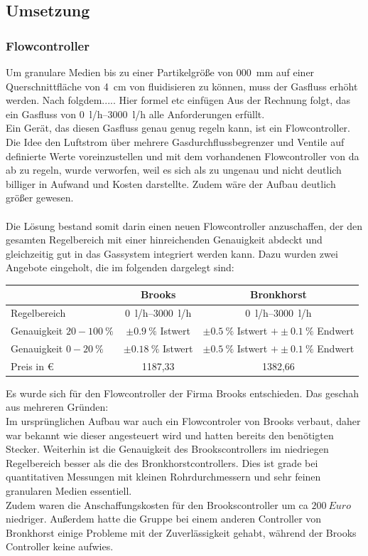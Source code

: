\subsection{Umsetzung}

\subsubsection{Flowcontroller}

Um granulare Medien bis zu einer Partikelgröße von \SI{000}{mm} auf einer Querschnittfläche von \SI{4}{cm} von fluidisieren zu können, muss der Gasfluss erhöht werden. Nach folgdem..... Hier formel etc einfügen
Aus der Rechnung folgt, das ein Gasfluss von \SIrange{0}{3000}{l/h} alle Anforderungen erfüllt. \\
Ein Gerät, das diesen Gasfluss genau genug regeln kann, ist ein Flowcontroller.
Die Idee den Luftstrom über mehrere Gasdurchflussbegrenzer und Ventile auf definierte Werte voreinzustellen und mit dem vorhandenen Flowcontroller von da ab zu regeln, wurde verworfen, weil es sich als zu ungenau und nicht deutlich billiger in Aufwand und Kosten darstellte. Zudem wäre der Aufbau deutlich größer gewesen. \\
\hfill \\
Die Lösung bestand somit darin einen neuen Flowcontroller anzuschaffen, der den gesamten Regelbereich mit einer hinreichenden Genauigkeit abdeckt und gleichzeitig gut in das Gassystem integriert werden kann. Dazu wurden zwei Angebote eingeholt, die im folgenden dargelegt sind:


\begin{tabular}{|l|c|c|}
	\hline  & Brooks & Bronkhorst \\ 
	\hline Regelbereich & \SIrange{0}{3000}{l/h} & \SIrange{0}{3000}{l/h} \\ 
	\hline Genauigkeit $20 - \SI{100}{\%}$ & $\pm \SI{0,9}{\%}$ Istwert & $\pm \SI{0,5}{\%}$ Istwert $+ \pm \SI{0,1}{\%}$ Endwert\\ 
	\hline Genauigkeit $0 - \SI{20}{\%}$ & $\pm \SI{0,18}{\%}$ Istwert & $\pm \SI{0,5}{\%}$ Istwert $+ \pm \SI{0,1}{\%}$ Endwert \\ 
	\hline Preis in \euro & 1187,33 & 1382,66 \\ 
	\bottomrule 
\end{tabular} 

\vspace{0,5cm}

Es wurde sich für den Flowcontroller der Firma Brooks entschieden. Das geschah aus mehreren Gründen: \\
Im ursprünglichen Aufbau war auch ein Flowcontroler von Brooks verbaut, daher war bekannt wie dieser angesteuert wird und hatten bereits den benötigten Stecker. Weiterhin ist die Genauigkeit des Brookscontrollers im niedriegen Regelbereich besser als die des Bronkhorstcontrollers. Dies ist grade bei quantitativen Messungen mit kleinen Rohrdurchmessern und sehr feinen granularen Medien essentiell. \\
Zudem waren die Anschaffungskosten für den Brookscontroller um ca $\SI{200}{Euro}$ niedriger. Außerdem hatte die Gruppe bei einem anderen Controller von Bronkhorst einige Probleme mit der Zuverlässigkeit gehabt, während der Brooks Controller keine aufwies.


